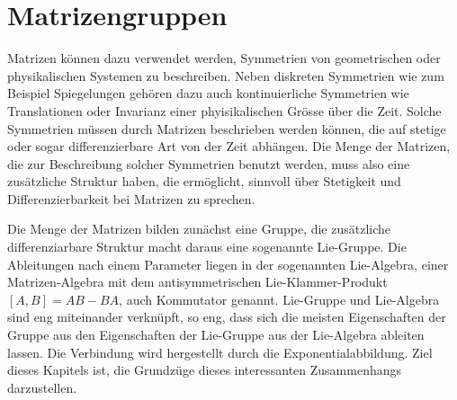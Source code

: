 %
%
%
\chapter{Matrizengruppen
\label{buch:chapter:matrizengruppen}}
\rhead{}
Matrizen können dazu verwendet werden, Symmetrien von geometrischen oder
physikalischen Systemen zu beschreiben.
Neben diskreten Symmetrien wie zum Beispiel Spiegelungen gehören dazu
auch kontinuierliche Symmetrien wie Translationen oder Invarianz einer
phyisikalischen Grösse über die Zeit.
Solche Symmetrien müssen durch Matrizen beschrieben werden können,
die auf stetige oder sogar differenzierbare Art von der Zeit abhängen.
Die Menge der Matrizen, die zur Beschreibung solcher Symmetrien benutzt
werden, muss also eine zusätzliche Struktur haben, die ermöglicht, 
sinnvoll über Stetigkeit und Differenzierbarkeit bei Matrizen
zu sprechen.

Die Menge der Matrizen bilden zunächst eine Gruppe,
die zusätzliche differenziarbare Struktur macht daraus
eine sogenannte Lie-Gruppe.
Die Ableitungen nach einem Parameter liegen in der sogenannten
Lie-Algebra, einer Matrizen-Algebra mit dem antisymmetrischen
Lie-Klammer-Produkt $[A,B]=AB-BA$, auch Kommutator genannt.
Lie-Gruppe und Lie-Algebra sind eng miteinander verknüpft,
so eng, dass sich die meisten Eigenschaften der Gruppe aus den Eigenschaften
der Lie-Gruppe aus der Lie-Algebra ableiten lassen.
Die Verbindung wird hergestellt durch die Exponentialabbildung.
Ziel dieses Kapitels ist, die Grundzüge dieses interessanten 
Zusammenhangs darzustellen.








